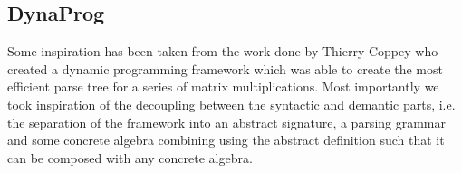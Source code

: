 \subsection{DynaProg}
Some inspiration has been taken from the work done by Thierry Coppey who created a dynamic programming framework which was able to create the most efficient parse tree for a series of matrix multiplications.
Most importantly we took inspiration of the decoupling between the syntactic and demantic parts, i.e. the separation of the framework into an abstract signature, a parsing grammar and some concrete algebra combining using the abstract definition such that it can be composed with any concrete algebra.
